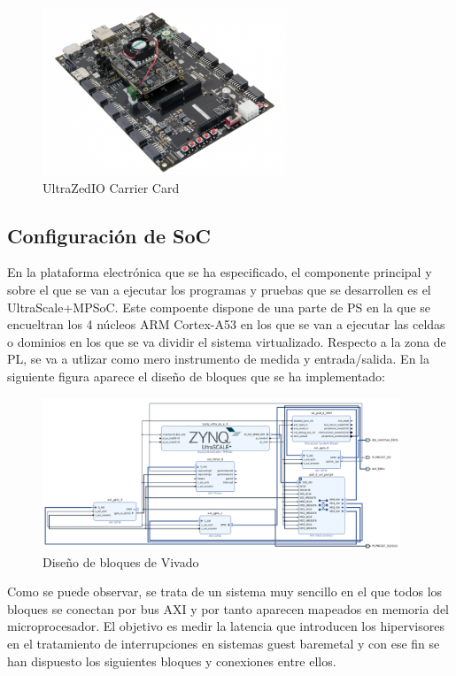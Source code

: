 \begin{figure}[h]
	\centering
	\includegraphics[width=0.65\textwidth]{recursos/ultrazed-eg-carrier.png}
	\caption{UltraZed\texttrademark IO Carrier Card}
	\label{fig:ultrazed-eg-carrier}
\end{figure}

\subsection{Configuración de SoC}

En la plataforma electrónica que se ha especificado, el componente principal y sobre el que se van a ejecutar los programas y pruebas que se desarrollen es el UltraScale+\texttrademark MPSoC. Este compoente dispone de una parte de \acrshort{PS} en la que se encueltran los 4 núcleos ARM Cortex-A53 en los que se van a ejecutar las celdas o dominios en los que se va dividir el sistema virtualizado. Respecto a la zona de \acrshort{PL}, se va a utlizar como mero instrumento de medida y entrada/salida. En la siguiente figura aparece el diseño de bloques que se ha implementado:

\begin{figure}[h]
	\centering
	\includegraphics[width=0.95\textwidth]{recursos/vivado_1.png}
	\caption{Diseño de bloques de Vivado}
	\label{fig:vivado_1}
\end{figure}

Como se puede observar, se trata de un sistema muy sencillo en el que todos los bloques se conectan por bus AXI y por tanto aparecen mapeados en memoria del microprocesador. El objetivo es medir la latencia que introducen los hipervisores en el tratamiento de interrupciones en sistemas guest baremetal y con ese fin se han dispuesto los siguientes bloques y conexiones entre ellos.\\


